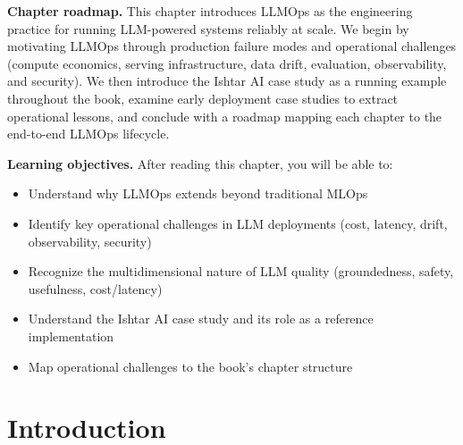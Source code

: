 \begin{tcolorbox}[
  title={\textbf{Chapter Overview}},
  colback=blue!5,
  colframe=blue!40!black,
  colbacktitle=blue!20,
  coltitle=black,
  fonttitle=\bfseries,
  boxrule=0.7pt,
  arc=4pt,
  left=5mm, right=5mm, top=4mm, bottom=4mm
]
\noindent\textbf{Chapter roadmap.}
This chapter introduces LLMOps as the engineering practice for running LLM-powered systems reliably at scale. We begin by motivating LLMOps through production failure modes and operational challenges (compute economics, serving infrastructure, data drift, evaluation, observability, and security). We then introduce the Ishtar AI case study as a running example throughout the book, examine early deployment case studies to extract operational lessons, and conclude with a roadmap mapping each chapter to the end-to-end LLMOps lifecycle.

\medskip
\noindent\textbf{Learning objectives.} After reading this chapter, you will be able to:
\begin{itemize}[leftmargin=1.5em, itemsep=3pt]
    \item Understand why LLMOps extends beyond traditional MLOps
    \item Identify key operational challenges in LLM deployments (cost, latency, drift, observability, security)
    \item Recognize the multidimensional nature of LLM quality (groundedness, safety, usefulness, cost/latency)
    \item Understand the Ishtar AI case study and its role as a reference implementation
    \item Map operational challenges to the book's chapter structure
\end{itemize}
\end{tcolorbox}


\section{Introduction}

\label{sec:intro}

